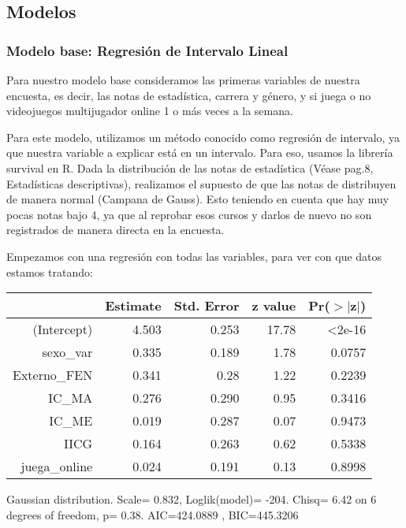 \documentclass[11pt]{article}
\begin{document}
\subsection{Modelos}

\subsubsection{Modelo base: Regresión de Intervalo Lineal}

Para nuestro modelo base consideramos las primeras variables de nuestra encuesta, es decir, las notas de estadística, carrera y género, y si juega o no videojuegos multijugador online 1 o más veces a la semana.

Para este modelo, utilizamos un método conocido como regresión de intervalo, ya que nuestra variable a explicar está en un intervalo. Para eso, usamos la librería survival en R. Dada la distribución de las notas de estadística (Véase pag.8, Estadísticas descriptivas), realizamos el supuesto de que las notas de distribuyen de manera normal (Campana de Gauss). Esto teniendo en cuenta que hay muy pocas notas bajo 4, ya que al reprobar esos cursos y darlos de nuevo no son registrados de manera directa en la encuesta.

Empezamos con una regresión con todas las variables, para ver con que datos estamos tratando:

\begin{center}
\begin{table}[ht]
\centering
\begin{tabular}{rrrrr}
 \hline
& Estimate & Std. Error & z value & Pr($>$$|$z$|$) \\
 \hline
(Intercept)  & 4.503      & 0.253  &17.78  &<2e-16\\ 
    sexo\_var &   0.335 & 0.189 & 1.78 & 0.0757\\
    Externo\_FEN & 0.341  & 0.28 & 1.22 & 0.2239\\
    IC\_MA  & 0.276  &  0.290 & 0.95 & 0.3416\\
    IC\_ME        &   0.019    &   0.287  & 0.07  & 0.9473\\
    IICG  & 0.164   &   0.263  & 0.62  & 0.5338\\
    juega\_online  &  0.024  &  0.191 & 0.13 & 0.8998\\
    \hline
   \end{tabular}
   \end{table}
\tiny{Gaussian distribution. Scale= 0.832, Loglik(model)= -204. Chisq= 6.42 on 6 degrees of freedom, p= 0.38. AIC=424.0889 , BIC=445.3206}
\end{center}   
\end{document}
